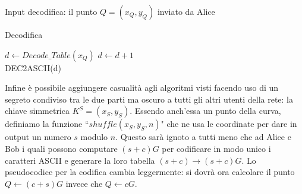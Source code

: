 \documentclass[a4paper,12pt]{tesiinfo}
\begin{document}
%
%
%
%
%
%
Input decodifica: il punto $Q = (x_Q, y_Q)$ inviato da Alice
\begin{algorithm}[H]
\caption{Decodifica}
\begin{algorithmic}
\State $d \gets Decode\_Table(x_Q)$ 
\State $d \gets d+1$
\EndIf\\
\Return DEC2ASCII(d) 
\end{algorithmic}
\end{algorithm}
Infine \`e possibile aggiungere casualit\`a agli algoritmi visti facendo uso di un segreto condiviso tra le due parti ma oscuro a tutti gli altri utenti della rete: la chiave simmetrica $K^S=(x_S, y_S)$. Essendo anch'essa un punto della curva, definiamo la funzione ``$shuffle(x_S, y_S, n)$" che ne usa le coordinate per dare in output un numero $s$ modulo $n$. Questo sar\`a ignoto a tutti meno che ad Alice e Bob i quali possono computare $(s+c)G$ per codificare in modo unico i caratteri ASCII e generare la loro tabella $(s+c) \to (s+c)G$. Lo pseudocodice per la codifica cambia leggermente: si dovr\`a ora calcolare il punto $Q \gets (c+s)G$ invece che $Q \gets cG$.
%
%
%
%
%
%
%
%
%
%
%
%
\end{document}
